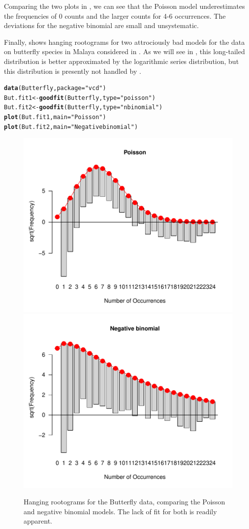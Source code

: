 \documentclass[11pt]{book}\usepackage[]{graphicx}\usepackage[]{color}
\makeatletter
\newcommand{\hlstr}[1]{\textcolor[rgb]{0.192,0.494,0.8}{#1}}%
\newcommand{\hlstd}[1]{\textcolor[rgb]{0.345,0.345,0.345}{#1}}%
\newcommand{\hlkwb}[1]{\textcolor[rgb]{0.69,0.353,0.396}{#1}}%
\newcommand{\hlkwc}[1]{\textcolor[rgb]{0.333,0.667,0.333}{#1}}%
\newcommand{\hlkwd}[1]{\textcolor[rgb]{0.737,0.353,0.396}{\textbf{#1}}}%
\newenvironment{kframe}{%
 \def\at@end@of@kframe{}%
 \ifinner\ifhmode%
  \def\at@end@of@kframe{\end{minipage}}%
  \begin{minipage}{\columnwidth}%
 \fi\fi%
 \def\FrameCommand##1{\hskip\@totalleftmargin \hskip-\fboxsep
 \colorbox{shadecolor}{##1}\hskip-\fboxsep
     \hskip-\linewidth \hskip-\@totalleftmargin \hskip\columnwidth}%
 \MakeFramed {\advance\hsize-\width
   \@totalleftmargin\z@ \linewidth\hsize
   \@setminipage}}%
 {\par\unskip\endMakeFramed%
 \at@end@of@kframe}
\newenvironment{knitrout}{}{} %
\renewenvironment{knitrout}{\small\renewcommand{\baselinestretch}{.85}}{} %
\makeatother
\begin{document}
Comparing the two plots in , we can see that the Poisson model underestimates the frequencies of 0 counts and the larger counts for 4-6 occurrences.
The deviations for the negative binomial are small and unsystematic.

Finally,  shows hanging rootograms for two 
attrociously bad models for the data on butterfly species in Malaya
considered in . As we will see in ,
this long-tailed distribution is better approximated by the logarithmic series
distribution, but this distribution is presently not handled by .
\begin{knitrout}
\color{fgcolor}\begin{kframe}
\begin{alltt}
\hlkwd{data}\hlstd{(Butterfly,} \hlkwc{package}\hlstd{=}\hlstr{"vcd"}\hlstd{)}
\hlstd{But.fit1} \hlkwb{<-} \hlkwd{goodfit}\hlstd{(Butterfly,} \hlkwc{type}\hlstd{=}\hlstr{"poisson"}\hlstd{)}
\hlstd{But.fit2} \hlkwb{<-} \hlkwd{goodfit}\hlstd{(Butterfly,} \hlkwc{type}\hlstd{=}\hlstr{"nbinomial"}\hlstd{)}
\hlkwd{plot}\hlstd{(But.fit1,} \hlkwc{main}\hlstd{=}\hlstr{"Poisson"}\hlstd{)}
\hlkwd{plot}\hlstd{(But.fit2,} \hlkwc{main}\hlstd{=}\hlstr{"Negative binomial"}\hlstd{)}
\end{alltt}
\end{kframe}\begin{figure}[htbp]


\centerline{\includegraphics[width=.48\textwidth]{ch03/fig/But-fit1} 
\includegraphics[width=.48\textwidth]{ch03/fig/But-fit2} }

\caption[Hanging rootograms for the Butterfly data, comparing the Poisson and negative binomial models]{Hanging rootograms for the Butterfly data, comparing the Poisson and negative binomial models. The lack of fit for both is readily apparent.\label{fig:But-fit}}
\end{figure}


\end{knitrout}
\end{document}
